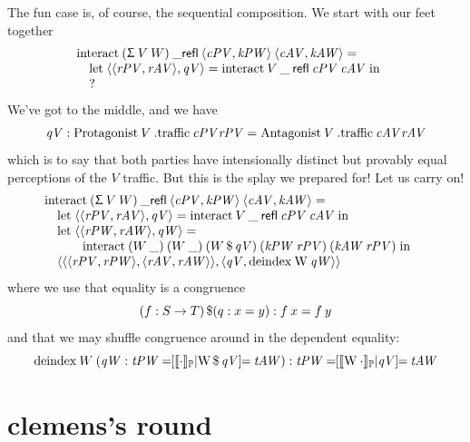 \documentclass{book}
\newcommand{\F}[1]{\green{\ensuremath{\mathrm{#1}}}}
\newcommand{\N}[1]{\black{\ensuremath{#1}}}
\newcommand{\lett}[3]{\mathrm{let}\;#1 = #2\;\mathrm{in}\; #3}
\newcommand{\pr}[2]{\red{\langle\N{#1},\N{#2}\rangle}}
\begin{document}
The fun case is, of course, the sequential composition. We start with our feet together
\[
\begin{array}{@{}l}
  \F{interact}\:(\Sg{V}{W})\:\_\refl\:\pr{\mathit{cPV}}{\mathit{kPW}}\:\pr{\mathit{cAV}}{\mathit{kAW}} =\\
  \quad
\begin{array}[t]{@{}l}
  \lett{\pr{\pr{\mathit{rPV}}{\mathit{rAV}}}{\mathit{qV}}}{\F{interact}\:V\:\_\:\refl\:\mathit{cPV}\:\mathit{cAV}}
       {\\ ?}
\end{array}
\end{array}\]
We've got to the middle, and we have
\[
\mathit{qV}: \Play{V}\:.\F{traffic}\:\mathit{cPV}\mathit{rPV} \EQ
             \Oppo{V}\:.\F{traffic}\:\mathit{cAV}\mathit{rAV} 
\]
which is to say that both parties have intensionally distinct but provably equal perceptions of the $V$ traffic. But this is the splay we prepared for! Let us carry on!
\[
\begin{array}{@{}l}
  \F{interact}\:(\Sg{V}{W})\:\_\refl\:\pr{\mathit{cPV}}{\mathit{kPW}}\:\pr{\mathit{cAV}}{\mathit{kAW}} =\\
  \quad
\begin{array}[t]{@{}l}
  \lett{\pr{\pr{\mathit{rPV}}{\mathit{rAV}}}{\mathit{qV}}}{\F{interact}\:V\:\_\:\refl\:\mathit{cPV}\:\mathit{cAV}}
       {\\ \lett{\pr{\pr{\mathit{rPW}}{\mathit{rAW}}}{\mathit{qW}}}
         {\\ \qquad \F{interact}\:(W\:\_)\:(W\:\_)\:(W\mathop{\F{\$}}\mathit{qV})\:
              (\mathit{kPW}\:\mathit{rPV})\:(\mathit{kAW}\:\mathit{rPV})}
         {\\ \pr{\pr{\pr{\mathit{rPV}}{\mathit{rPW}}}{\pr{\mathit{rAV}}{\mathit{rAW}}}}
                {\F{\langle\N{\mathit{qV}},\N{\F{deindex}\:W\:\mathit{qW}}\rangle}}}}
\end{array}
\end{array}\]
where we use that equality is a congruence
\[(f:S\to T)\mathop{\F{\$}}(q:x\EQ y) : f\:x \EQ f\:y\]
and that we may shuffle congruence around in the dependent equality:
\[
\F{deindex}\:W\:(\mathit{qW} :
\heq{\protocol{\cdot}}{W\mathop{\F{\$}}\mathit{qV}}{\mathit{tPW}}{\mathit{tAW}}) :
\heq{\protocol{W\:\cdot}}{\mathit{qV}}{\mathit{tPW}}{\mathit{tAW}}
\]


\section{clemens's round}
\end{document}
